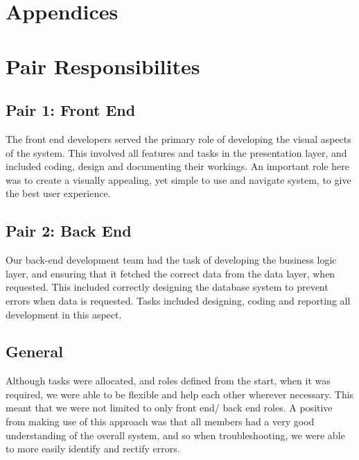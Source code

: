 \documentclass[paper=a4, fontsize=11pt]{scrartcl}
\numberwithin{equation}{section}		%
\numberwithin{figure}{section}			%
\numberwithin{table}{section}				%
\begin{document}
\section*{Appendices}
\appendix
\section{Pair Responsibilites}

\subsection{Pair 1: Front End}
The front end developers served the primary role of developing the visual aspects of the system. This involved all features and tasks in the presentation layer, and included coding, design and documenting their workings. An important role here was to create a visually appealing, yet simple to use and navigate system, to give the best user experience.    
\subsection{Pair 2: Back End}
Our back-end development team had the task of developing the business logic layer, and ensuring that it fetched the correct data from the data layer, when requested. This included correctly designing the database system to prevent errors when data is requested. Tasks included designing, coding and reporting all development in this aspect.
\subsection{General}
Although tasks were allocated, and roles defined from the start, when it was required, we were able to be flexible and help each other wherever necessary. This meant that we were not limited to only front end/ back end roles. A positive from making use of this approach was that all members had a very good understanding of the overall system, and so when troubleshooting, we were able to more easily identify and rectify errors.
\end{document}
